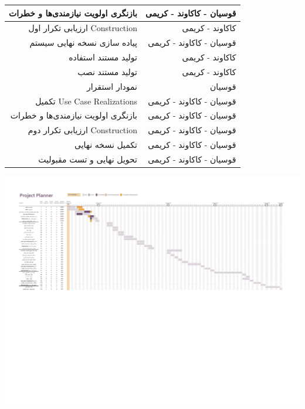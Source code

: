 \documentclass{article}
\begin{document}
\begin{tabular}{ | r | r | }
	بازنگری اولویت‌ نیازمندی‌ها و خطرات & قوسیان - کاکاوند - کریمی \\ \hline
	ارزیابی تکرار اول Construction & کاکاوند - کریمی \\ \hline
	 پیاده سازی نسخه نهایی سیستم & قوسیان - کاکاوند - کریمی \\ \hline
	 تولید مستند استفاده & کاکاوند - کریمی \\ \hline
	 تولید مستند نصب & کاکاوند - کریمی \\ \hline
	نمودار استقرار & قوسیان \\ \hline
	تکمیل Use Case Realizations & قوسیان - کاکاوند - کریمی \\ \hline
	بازنگری اولویت‌ نیازمندی‌ها و خطرات & قوسیان - کاکاوند - کریمی \\ \hline
	ارزیابی تکرار دوم Construction & قوسیان - کاکاوند - کریمی \\ \hline
	تکمیل نسخه نهایی & قوسیان - کاکاوند - کریمی \\ \hline
	تحویل نهایی و تست مقبولیت & قوسیان - کاکاوند - کریمی \\ \hline
\end{tabular}



\newpage
\eject \pdfpagewidth=350mm \pdfpageheight=200mm
\begin{center}
\includegraphics[width=300mm]{Gantt_v2.pdf}
\end{center}
\end{document}

